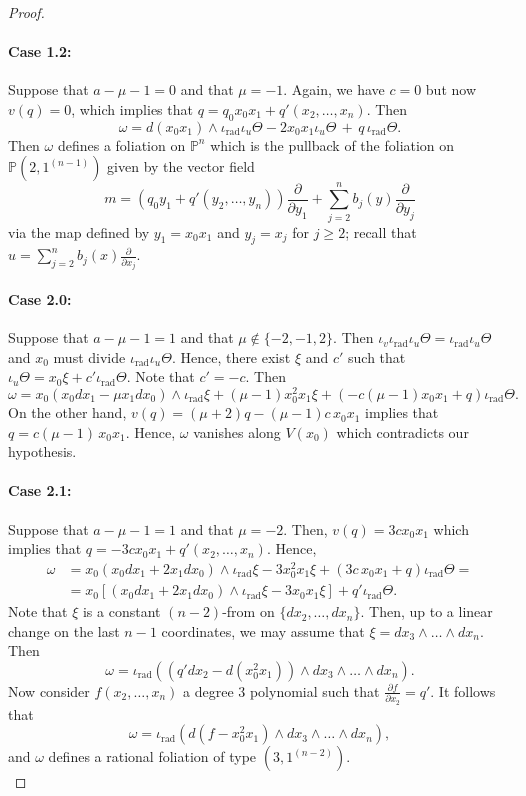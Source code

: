 \documentclass[twoside]{amsart}
\numberwithin{equation}{section}
\newcommand{\pn}{{\mathbb{P}^{n}}}
\DeclareMathOperator{\rad}{rad}
\def\PP{{\mathbb{P}}}
\newcommand{\del}[1]{\frac{\partial}{\partial #1}}
\theoremstyle{definition}
\begin{document}
\begin{proof}
 \paragraph{\textbf{Case 1.2:}} Suppose that $a-\mu-1 = 0$ and that $\mu =-1$. Again, we have $c=0$ but now $v(q) = 0$, which implies that $q = q_0 x_0x_1 + q'(x_2, \dots, x_n)$. Then
 \[
 \omega = d(x_0x_1) \wedge \iota_{\rad}\iota_u \Theta -2x_0x_1\iota_u \Theta \, + \,q \, \iota_{\rad}\Theta.
 \]
 Then $\omega$ defines a foliation on $\pn$ which is the pullback of the foliation on $\PP(2,1^{(n-1)})$ given by the vector field
 \[
 m = (q_0 y_1 + q'(y_2, \dots, y_n))\del{ y_1} + \sum_{j=2}^n b_j(y)\del{ y_j}
 \]
 via the map defined by $y_1 = x_0x_1$ and $y_j = x_j$ for $j\geq 2$; recall that $u = \sum_{j=2}^n b_j(x)\del{ x_j}$.
 \\
 \paragraph{\textbf{Case 2.0:}} Suppose that $a-\mu-1 = 1$ and that $\mu \not\in \{ -2,-1,2\}$. Then $\iota_v\iota_{\rad}\iota_u \Theta = \iota_{\rad}\iota_u \Theta$ and $x_0$ must divide $\iota_{\rad}\iota_u \Theta$. Hence, there exist $\xi$ and $c'$ such that $\iota_u \Theta = x_0 \xi + c'\iota_{\rad}\Theta$. Note that $c' = -c$. Then
 \[
 \omega = x_0(x_0 dx_1 - \mu x_1 dx_0) \wedge \iota_{\rad}\xi + (\mu-1)x_0^2x_1 \xi + (-c(\mu-1)x_0x_1 + q ) \iota_{\rad}\Theta.
 \]
 On the other hand, $v(q) = (\mu+2)q -(\mu-1) c\, x_0x_1$ implies that $q = c(\mu-1)\, x_0x_1$. Hence, $\omega$ vanishes along $V(x_0)$ which contradicts our hypothesis. 
\\
 \paragraph{\textbf{Case 2.1:}} Suppose that $a-\mu-1 = 1$ and that $\mu = -2$. Then, $v(q) = 3 c x_0x_1$ which implies that $q = -3cx_0x_1 + q'(x_2, \dots, x_n)$. Hence,
 \begin{align*}
 \omega &= x_0(x_0 dx_1 +2 x_1 dx_0) \wedge \iota_{\rad}\xi -3x_0^2x_1 \xi + (3c\,x_0x_1 + q ) \iota_{\rad}\Theta = \\
 & = x_0 [(x_0 dx_1 +2 x_1 dx_0) \wedge \iota_{\rad}\xi -3x_0x_1\xi] + q' \iota_{\rad} \Theta. 
 \end{align*}
 Note that $\xi$ is a constant $(n-2)$-from on $\{dx_2, \dots, dx_n\}$. Then, up to a linear change on the last $n-1$ coordinates, we may assume that $\xi = dx_3\wedge \dots \wedge dx_n$. Then
 \[
 \omega = \iota_{\rad}( (q'dx_2- d(x_0^2x_1))\wedge dx_3 \wedge \dots \wedge dx_n).
 \]
 Now consider $f(x_2, \dots, x_n)$ a degree $3$ polynomial such that $\frac{\partial f}{\partial x_2} = q'$. It follows that 
 \[
 \omega = \iota_{\rad}( d(f-x_0^2x_1)\wedge dx_3 \wedge \dots \wedge dx_n),
 \]
 and $\omega$ defines a rational foliation of type $(3,1^{(n-2)})$. 
 \\

\end{proof}
\end{document}
